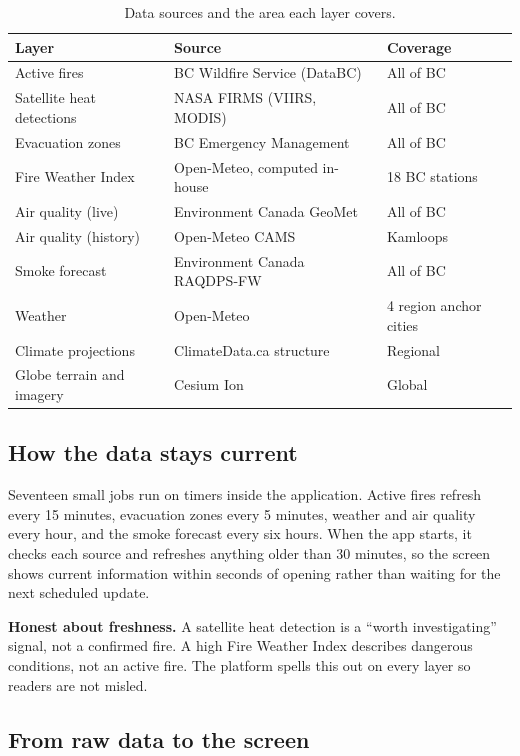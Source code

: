 \documentclass[11pt]{article}
\newcommand{\callout}[1]{%
  \par\medskip\noindent
  \colorbox{mist}{\parbox{\dimexpr\linewidth-2\fboxsep}{\color{ink}\small #1}}%
  \par\medskip}
\begin{document}
\begin{table}[h]
\centering
\small
\begin{tabular}{@{}L{3.6cm}L{5.6cm}L{3.6cm}@{}}
\toprule
\textbf{Layer} & \textbf{Source} & \textbf{Coverage} \\
\midrule
Active fires & BC Wildfire Service (DataBC) & All of BC \\
Satellite heat detections & NASA FIRMS (VIIRS, MODIS) & All of BC \\
Evacuation zones & BC Emergency Management & All of BC \\
Fire Weather Index & Open-Meteo, computed in-house & 18 BC stations \\
Air quality (live) & Environment Canada GeoMet & All of BC \\
Air quality (history) & Open-Meteo CAMS & Kamloops \\
Smoke forecast & Environment Canada RAQDPS-FW & All of BC \\
Weather & Open-Meteo & 4 region anchor cities \\
Climate projections & ClimateData.ca structure & Regional \\
Globe terrain and imagery & Cesium Ion & Global \\
\bottomrule
\end{tabular}
\caption{Data sources and the area each layer covers.}
\end{table}

\subsection{How the data stays current}

Seventeen small jobs run on timers inside the application. Active fires refresh
every 15 minutes, evacuation zones every 5 minutes, weather and air quality
every hour, and the smoke forecast every six hours. When the app starts, it
checks each source and refreshes anything older than 30 minutes, so the screen
shows current information within seconds of opening rather than waiting for the
next scheduled update.

\callout{\textbf{Honest about freshness.} A satellite heat detection is a
``worth investigating'' signal, not a confirmed fire. A high Fire Weather Index
describes dangerous conditions, not an active fire. The platform spells this out
on every layer so readers are not misled.}

\subsection{From raw data to the screen}
\end{document}
